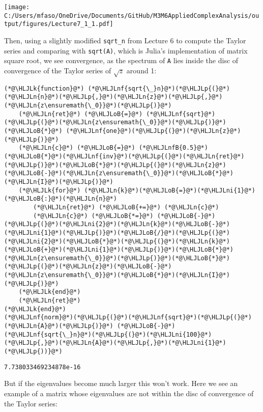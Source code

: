 \documentclass[12pt,a4paper]{article}
\newcommand{\HLJLk}[1]{\textcolor[RGB]{148,91,176}{\textbf{#1}}}
\newcommand{\HLJLn}[1]{#1}
\newcommand{\HLJLnf}[1]{\textcolor[RGB]{66,102,213}{#1}}
\newcommand{\HLJLnfB}[1]{\textcolor[RGB]{59,151,46}{#1}}
\newcommand{\HLJLni}[1]{\textcolor[RGB]{59,151,46}{#1}}
\newcommand{\HLJLoB}[1]{\textcolor[RGB]{102,102,102}{\textbf{#1}}}
\newcommand{\HLJLp}[1]{#1}
\begin{document}
\texttt{[image: C:/Users/mfaso/OneDrive/Documents/GitHub/M3M6AppliedComplexAnalysis/output/figures/Lecture7\_1\_1.pdf]}

Then, using a slightly modified \texttt{sqrt\_n} from Lecture 6 to compute the Taylor series and comparing with \texttt{sqrt(A)}, which is Julia's implementation of matrix square root, we see convergence, as the spectrum of \texttt{A} lies inside the disc of convergence of the Taylor series of $\sqrt{z}$ around 1:


\begin{lstlisting}
(*@\HLJLk{function}@*) (*@\HLJLnf{sqrt{\_}n}@*)(*@\HLJLp{(}@*)(*@\HLJLn{n}@*)(*@\HLJLp{,}@*)(*@\HLJLn{z}@*)(*@\HLJLp{,}@*)(*@\HLJLn{z\ensuremath{\_0}}@*)(*@\HLJLp{)}@*)
    (*@\HLJLn{ret}@*) (*@\HLJLoB{=}@*) (*@\HLJLnf{sqrt}@*)(*@\HLJLp{(}@*)(*@\HLJLn{z\ensuremath{\_0}}@*)(*@\HLJLp{)}@*) (*@\HLJLoB{*}@*) (*@\HLJLnf{one}@*)(*@\HLJLp{(}@*)(*@\HLJLn{z}@*)(*@\HLJLp{)}@*)
    (*@\HLJLn{c}@*) (*@\HLJLoB{=}@*) (*@\HLJLnfB{0.5}@*)(*@\HLJLoB{*}@*)(*@\HLJLnf{inv}@*)(*@\HLJLp{(}@*)(*@\HLJLn{ret}@*)(*@\HLJLp{)}@*)(*@\HLJLoB{*}@*)(*@\HLJLp{(}@*)(*@\HLJLn{z}@*)(*@\HLJLoB{-}@*)(*@\HLJLn{z\ensuremath{\_0}}@*)(*@\HLJLoB{*}@*)(*@\HLJLn{I}@*)(*@\HLJLp{)}@*)
    (*@\HLJLk{for}@*) (*@\HLJLn{k}@*)(*@\HLJLoB{=}@*)(*@\HLJLni{1}@*)(*@\HLJLoB{:}@*)(*@\HLJLn{n}@*)
        (*@\HLJLn{ret}@*) (*@\HLJLoB{+=}@*) (*@\HLJLn{c}@*)
        (*@\HLJLn{c}@*) (*@\HLJLoB{*=}@*) (*@\HLJLoB{-}@*)(*@\HLJLp{(}@*)(*@\HLJLni{2}@*)(*@\HLJLn{k}@*)(*@\HLJLoB{-}@*)(*@\HLJLni{1}@*)(*@\HLJLp{)}@*)(*@\HLJLoB{/}@*)(*@\HLJLp{(}@*)(*@\HLJLni{2}@*)(*@\HLJLoB{*}@*)(*@\HLJLp{(}@*)(*@\HLJLn{k}@*)(*@\HLJLoB{+}@*)(*@\HLJLni{1}@*)(*@\HLJLp{)}@*)(*@\HLJLoB{*}@*)(*@\HLJLn{z\ensuremath{\_0}}@*)(*@\HLJLp{)}@*)(*@\HLJLoB{*}@*)(*@\HLJLp{(}@*)(*@\HLJLn{z}@*)(*@\HLJLoB{-}@*)(*@\HLJLn{z\ensuremath{\_0}}@*)(*@\HLJLoB{*}@*)(*@\HLJLn{I}@*)(*@\HLJLp{)}@*)
    (*@\HLJLk{end}@*)
    (*@\HLJLn{ret}@*)
(*@\HLJLk{end}@*)
(*@\HLJLnf{norm}@*)(*@\HLJLp{(}@*)(*@\HLJLnf{sqrt}@*)(*@\HLJLp{(}@*)(*@\HLJLn{A}@*)(*@\HLJLp{)}@*) (*@\HLJLoB{-}@*) (*@\HLJLnf{sqrt{\_}n}@*)(*@\HLJLp{(}@*)(*@\HLJLni{100}@*)(*@\HLJLp{,}@*)(*@\HLJLn{A}@*)(*@\HLJLp{,}@*)(*@\HLJLni{1}@*)(*@\HLJLp{))}@*)
\end{lstlisting}

\begin{lstlisting}
7.738033469234878e-16
\end{lstlisting}


But  if the eigenvalues become much larger this won't work. Here we see an example of a matrix whose eigenvalues are not within the disc of convergence of the Taylor series:
\end{document}
